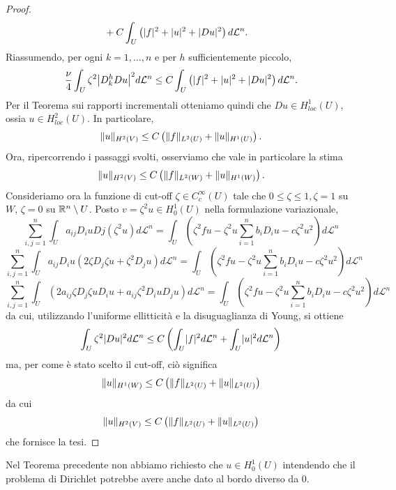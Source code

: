 \begin{proof}
\begin{align*}
		&+ C\int_U\left( \lvert f\rvert^2 + \lvert u\rvert^2 + \lvert Du\rvert^2\right) d\mathcal{L}^n.
	\end{align*}
	Riassumendo, per ogni $k =1,\dots, n$ e per $h$ sufficientemente piccolo, 
	\[  \frac{\nu}{4} \int_U \zeta^2 \abs*{D^h_kDu}^2 d\mathcal{L}^n \le C\int_U\left( \abs{f}^2 + \abs{u}^2 + \abs{Du}^2\right) d\mathcal{L}^n. \]
	Per il Teorema sui rapporti incrementali otteniamo quindi che $Du \in H^1_{loc}(U)$, ossia $u \in H^2_{loc}(U)$. In particolare,
	\[ \lVert u\rVert_{H^2(V)} \le C\left( \lVert f\rVert_{L^2(U)} + \lVert u\rVert_{H^1(U)}\right). \]
	\indent Ora, ripercorrendo i passaggi svolti, osserviamo che vale in particolare la stima
	\[ \lVert u\rVert_{H^2(V)} \le C\left( \lVert f\rVert_{L^2(W)} + \lVert u\rVert_{H^1(W)}\right). \]
	Consideriamo ora la funzione di cut-off $\zeta \in C^\infty_c(U)$ tale che $0\le \zeta \le 1, \zeta = 1$ su $W$, $\zeta = 0$ su $\mathbb{R}^n \setminus U$. Posto $v = \zeta^2 u \in H^1_0(U)$ nella formulazione variazionale,
	\[ \sum_{i,j=1}^{n}\int_U a_{ij}D_iuDj\left( \zeta^2u\right) d\mathcal{L}^n = \int_U \left( \zeta^2fu - \zeta^2 u \sum_{i=1}^{n}b_iD_iu -c\zeta^2u^2\right) d\mathcal{L}^n \]
	\[ \sum_{i,j=1}^{n}\int_U a_{ij}D_iu\left( 2\zeta D_j \zeta u + \zeta^2 D_ju\right) d\mathcal{L}^n = \int_U \left( \zeta^2fu - \zeta^2 u \sum_{i=1}^{n}b_iD_iu -c\zeta^2u^2\right) d\mathcal{L}^n \]
	\[ \sum_{i,j=1}^{n}\int_U \left( 2a_{ij}\zeta D_j \zeta u D_iu +a_{ij}\zeta^2D_iuD_ju\right)  d\mathcal{L}^n = \int_U \left( \zeta^2fu - \zeta^2 u \sum_{i=1}^{n}b_iD_iu -c\zeta^2u^2\right) d\mathcal{L}^n \]
	da cui, utilizzando l'uniforme ellitticità e la disuguaglianza di Young, si ottiene
	\[ \int_U \zeta^2\lvert Du\rvert^2d\mathcal{L}^n \le C\left(  \int_U \lvert f\rvert^2d\mathcal{L}^n +\int_U \lvert u\rvert^2d\mathcal{L}^n\right)  \]
	ma, per come è stato scelto il cut-off, ciò significa
	\[ \lVert u\rVert_{H^1(W)} \le C\left( \lVert f\rVert_{L^2(U)} + \lVert u\rVert_{L^2(U)}\right)  \]
	da cui
	\[ \lVert u\rVert_{H^2(V)} \le C\left( \lVert f\rVert_{L^2(U)} + \lVert u\rVert_{L^2(U)}\right)  \]
	che fornisce la tesi.
\end{proof}
\begin{osservazione}
	Nel Teorema precedente non abbiamo richiesto che $u \in H^1_0(U)$ intendendo che il problema di Dirichlet potrebbe avere anche dato al bordo diverso da $0$.
\end{osservazione}

